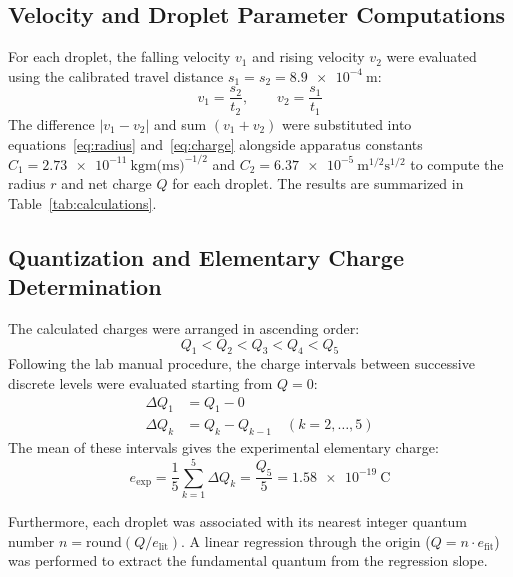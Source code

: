 \documentclass[journal]{IEEEtran}
\begin{document}
\subsection{Velocity and Droplet Parameter Computations}
For each droplet, the falling velocity $v_1$ and rising velocity $v_2$ were evaluated using the calibrated travel distance $s_1 = s_2 = \SI{8.9e-4}{\meter}$:
\begin{equation}
    v_1 = \frac{s_2}{t_2}, \qquad v_2 = \frac{s_1}{t_1}
\end{equation}
The difference $|v_1 - v_2|$ and sum $(v_1 + v_2)$ were substituted into equations~\eqref{eq:radius} and~\eqref{eq:charge} alongside apparatus constants $C_1 = \SI{2.73e-11}{\kilogram\meter(\meter\second)^{-1/2}}$ and $C_2 = \SI{6.37e-5}{\meter^{1/2}\second^{1/2}}$ to compute the radius $r$ and net charge $Q$ for each droplet. The results are summarized in Table~\ref{tab:calculations}.

\subsection{Quantization and Elementary Charge Determination}
The calculated charges were arranged in ascending order:
\begin{equation}
    Q_1 < Q_2 < Q_3 < Q_4 < Q_5
\end{equation}
Following the lab manual procedure, the charge intervals between successive discrete levels were evaluated starting from $Q=0$:
\begin{align}
    \Delta Q_1 &= Q_1 - 0 \\
    \Delta Q_k &= Q_k - Q_{k-1} \quad (k = 2, \dots, 5)
\end{align}
The mean of these intervals gives the experimental elementary charge:
\begin{equation}
    e_{\text{exp}} = \frac{1}{5} \sum_{k=1}^5 \Delta Q_k = \frac{Q_5}{5} = \SI{1.58e-19}{\coulomb}
\end{equation}

Furthermore, each droplet was associated with its nearest integer quantum number $n = \text{round}(Q/e_{\text{lit}})$. A linear regression through the origin ($Q = n \cdot e_{\text{fit}}$) was performed to extract the fundamental quantum from the regression slope.
\end{document}
